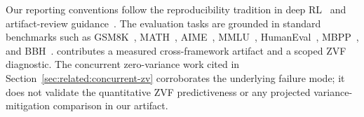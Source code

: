 Our reporting conventions follow the reproducibility tradition in deep
RL~\cite{henderson2018deep, agarwal2021deep, bettini2023benchmarl,
patterson2024empirical, jordan2024benchmarking, zhang2024benchvariance} and
artifact-review guidance~\cite{pineau2020improving, acm2020badges}. The
evaluation tasks are grounded in standard benchmarks such as
GSM8K~\cite{cobbe2021training}, MATH~\cite{hendrycks2021math},
AIME~\cite{maa2024aime}, MMLU~\cite{hendrycks2021mmlu},
HumanEval~\cite{chen2021codex}, MBPP~\cite{austin2021mbpp}, and
BBH~\cite{suzgun2023bbh}. \ours{} contributes a measured cross-framework
artifact and a scoped ZVF diagnostic. The concurrent zero-variance work cited
in Section~\ref{sec:related:concurrent-zv} corroborates the underlying failure
mode; it does not validate the quantitative ZVF predictiveness or any
projected variance-mitigation comparison in our artifact.

